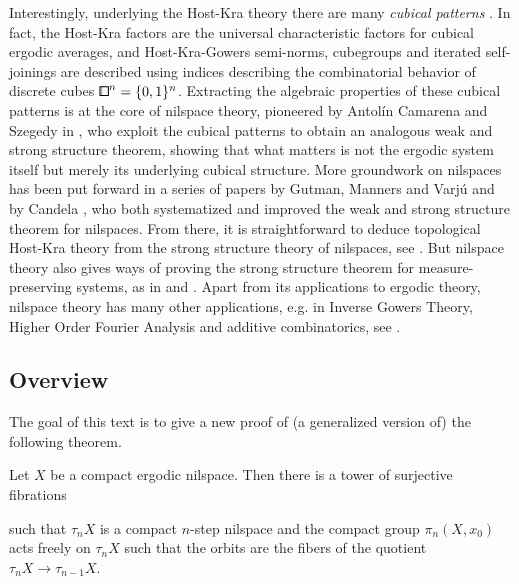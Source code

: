Interestingly, underlying the Host-Kra theory there are many \emph{cubical patterns} \cite{Host2004,Host2005,Host2005a,Host2008, Host2010}.
In fact, the Host-Kra factors are the universal characteristic factors for cubical ergodic averages,
and Host-Kra-Gowers semi-norms, cubegroups and iterated self-joinings
are described using indices describing the combinatorial behavior of discrete cubes ${\bbox}^n = \{0,1\}^n$.
Extracting the algebraic properties of these cubical patterns is at the core of nilspace theory,
pioneered by Antol\'in Camarena and Szegedy in \cite{Camarena2010},
who exploit the cubical patterns to obtain an analogous weak and strong structure theorem,
showing that what matters is not the ergodic system itself
but merely its underlying cubical structure.
More groundwork on nilspaces has been put forward in a series of papers by Gutman, Manners and Varj\'u \cite{Gutman2020,Gutman2020a,Gutman2020b}
and by Candela \cite{Candela2017,Candela2017a},
who both systematized and improved the weak and strong structure theorem for nilspaces.
From there, it is straightforward to deduce topological Host-Kra theory \cite{Host2010,Shao2012}
from the strong structure theory of nilspaces, see \cite{Glasner2018,Gutman2020b,Glasner2023}.
But nilspace theory also gives ways of proving the strong structure theorem for measure-preserving systems,
as in \cite{Gutman2023} and \cite{Candela2020,Candela2023}.
Apart from its applications to ergodic theory, nilspace theory has many other applications,
e.g. in Inverse Gowers Theory, Higher Order Fourier Analysis and additive combinatorics,
see \cite{Candela2021,Candela2022,Jamneshan2026d}.

\subsection*{Overview}

The goal of this text is to give a new proof of (a generalized version of) the following theorem.

\begin{theorem*}
Let $X$ be a compact ergodic nilspace.
Then there is a tower of surjective fibrations
\begin{center}
\end{center}
such that $\tau_n X$ is a compact $n$-step nilspace
and the compact group $\pi_n(X,x_0)$ acts freely on $\tau_n X$
such that the orbits are the fibers of the quotient $\tau_n X\to\tau_{n-1} X$.
\end{theorem*}


